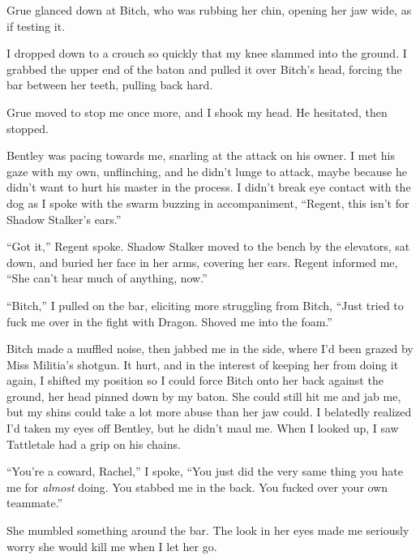 Grue glanced down at Bitch, who was rubbing her chin, opening her jaw wide, as if testing it.



I dropped down to a crouch so quickly that my knee slammed into the ground.  I grabbed the upper end of the baton and pulled it over Bitch's head, forcing the bar between her teeth, pulling back hard.



Grue moved to stop me once more, and I shook my head.  He hesitated, then stopped.



Bentley was pacing towards me, snarling at the attack on his owner.  I met his gaze with my own, unflinching, and he didn't lunge to attack, maybe because he didn't want to hurt his master in the process.  I didn't break eye contact with the dog as I spoke with the swarm buzzing in accompaniment, ``Regent, this isn't for Shadow Stalker's ears.''



``Got it,'' Regent spoke.  Shadow Stalker moved to the bench by the elevators, sat down, and buried her face in her arms, covering her ears.  Regent informed me, ``She can't hear much of anything, now.''



``Bitch,'' I pulled on the bar, eliciting more struggling from Bitch, ``Just tried to fuck me over in the fight with Dragon.  Shoved me into the foam.''



Bitch made a muffled noise, then jabbed me in the side, where I'd been grazed by Miss Militia's shotgun.  It hurt, and in the interest of keeping her from doing it again, I shifted my position so I could force Bitch onto her back against the ground, her head pinned down by my baton.  She could still hit me and jab me, but my shins could take a lot more abuse than her jaw could.  I belatedly realized I'd taken my eyes off Bentley, but he didn't maul me.  When I looked up, I saw Tattletale had a grip on his chains.



``You're a coward, Rachel,'' I spoke, ``You just did the very same thing you hate me for \emph{almost} doing.  You stabbed me in the back.  You fucked over your own teammate.''



She mumbled something around the bar.  The look in her eyes made me seriously worry she would kill me when I let her go.



